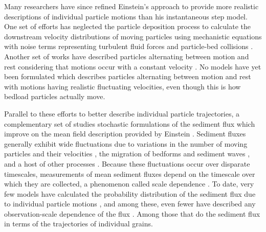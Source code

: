 Many researchers have since refined Einstein's approach to provide more realistic descriptions of individual particle motions than his instantaneous step model.
One set of efforts has neglected the particle deposition process to calculate the downstream velocity distributions of moving particles using mechanistic equations with noise terms representing turbulent fluid forces and particle-bed collisions \citep{Ancey2014,Fan2014}. 
Another set of works have described particles alternating between motion and rest considering that motions occur with a constant velocity \citep{Lisle1998,Lajeunesse2017}. 
No models have yet been formulated which describes particles alternating between motion and rest with motions having realistic fluctuating velocities, even though this is how bedload particles actually move.
\DIFaddbegin {}\DIFaddend 

Parallel to these efforts to better describe individual particle trajectories, a complementary set of studies \DIFdelbegin {}\DIFdelend \DIFaddbegin {}\DIFaddend stochastic formulations of the sediment flux which improve on the mean field description provided by Einstein \citep{Turowski2010,Furbish2012a,Ancey2020}. 
Sediment fluxes generally exhibit wide fluctuations due to variations in the number of moving particles and their velocities \citep{Bohm2005a,Ancey2006,Furbish2012a}, the migration of bedforms and sediment waves \citep{Guala2014,Recking2012}, and a host of other processes \citep{Dhont2018}.
Because these fluctuations occur over disparate timescales, measurements of mean sediment fluxes depend on the timescale over which they are collected, a phenomenon called scale dependence \citep{Saletti2015,Dhont2018,Singh2009,Turowski2010,Ancey2020}.
To date, very few models have calculated the probability distribution of the \DIFdelbegin {}\DIFdelend \DIFaddbegin {}\DIFaddend sediment flux due to individual particle motions \citep{Ancey2008,Ancey2014}, and among these, even fewer have described any observation-scale dependence of the flux \citep{Ancey2020a,Turowski2010}.
Among those that do \DIFdelbegin {}\DIFdelend \DIFaddbegin {}\DIFaddend the sediment flux in terms of the \DIFdelbegin {}\DIFdelend trajectories of individual grains.

